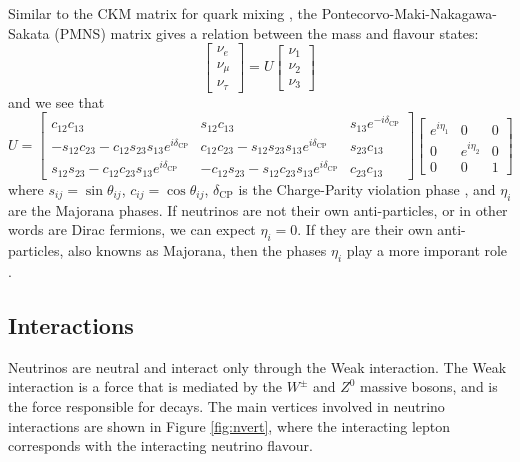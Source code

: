 Similar to the CKM matrix for quark mixing \cite{pdg_ckm}, the Pontecorvo-Maki-Nakagawa-Sakata (PMNS) matrix \cite{pmns} gives a relation between the mass and flavour states:
\begin{equation}
  \begin{bmatrix}
    \nu_{e} \\
    \nu_{\mu} \\
    \nu_{\tau}
  \end{bmatrix}
  =
  U
  \begin{bmatrix}
    \nu_{1} \\
    \nu_{2} \\
    \nu_{3}
  \end{bmatrix}
  \, 
\end{equation}
and we see that
\begin{equation}
  U = 
  \begin{bmatrix}
    c_{12}c_{13} & s_{12}c_{13} & s_{13}e^{-i\delta_{\text{CP}}} \\
    -s_{12}c_{23}-c_{12}s_{23}s_{13}e^{i\delta_{\text{CP}}} & c_{12}c_{23} - s_{12}s_{23}s_{13}e^{i\delta_{\text{CP}}} & s_{23}c_{13} \\
    s_{12}s_{23}-c_{12}c_{23}s_{13}e^{i\delta_{\text{CP}}} & -c_{12}s_{23} - s_{12}c_{23}s_{13}e^{i\delta_{\text{CP}}} & c_{23}c_{13}
  \end{bmatrix}
  \begin{bmatrix}
    e^{i\eta_{1}} & 0 & 0 \\
    0 & e^{i\eta_{2}} & 0 \\
    0 & 0 & 1
  \end{bmatrix}
\end{equation}
where $s_{ij} = \sin\theta_{ij}$, $c_{ij}=\cos\theta_{ij}$, $\delta_{\text{CP}}$ is the Charge-Parity violation phase \cite{pmns}, and $\eta_{i}$ are the Majorana phases. If neutrinos are not their own anti-particles, or in other words are Dirac fermions, we can expect $\eta_{i} = 0$. If they are their own anti-particles, also knowns as Majorana, then the phases $\eta_{i}$ play a more imporant role \cite{pdg}. 

\subsection{Interactions}\label{subsec:int}

Neutrinos are neutral and interact only through the Weak interaction. The Weak interaction is a force that is mediated by the $W^{\pm}$ and $Z^{0}$ massive bosons, and is the force responsible for decays. The main vertices involved in neutrino interactions are shown in Figure \ref{fig:nvert}, where the interacting lepton corresponds with the interacting neutrino flavour. 

